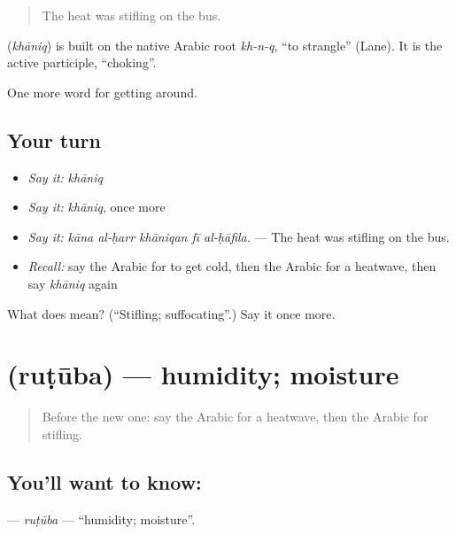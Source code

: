 \begin{quote}
The heat was stifling on the bus.
\end{quote}

\begin{cousinweb}
\textbf{} (\emph{khāniq}) is built on the native Arabic root \emph{kh-n-q}, \textquotedblleft{}to strangle\textquotedblright{} (Lane). It is the active participle, \textquotedblleft{}choking\textquotedblright{}.
\end{cousinweb}

\begin{grammarlens}[title={What you've built}]
One more word for getting around.
\end{grammarlens}

\subsection*{Your turn}
\begin{itemize}
\raggedright
  \item \emph{Say it:} \emph{khāniq}
  \item \emph{Say it:} \emph{khāniq}, once more
  \item \emph{Say it:} \emph{kāna al-ḥarr khāniqan fī al-ḥāfila.} — The heat was stifling on the bus.
  \item \emph{Recall:} say the Arabic for to get cold, then the Arabic for a heatwave, then say \emph{khāniq} again
\end{itemize}

\begin{tcolorbox}[breakable,colback=teal!4,colframe=teal!35!black,title={Before you move on}]
What does  mean? (\textquotedblleft{}Stifling; suffocating\textquotedblright{}.) Say it once more.
\end{tcolorbox}
\section[\texorpdfstring{\ar{رطوبة} (ruṭūba)}{رطوبة (ruṭūba)}]{ (ruṭūba) — humidity; moisture}

\label{lesson:AR-C484-rutuba}



\begin{quote}
Before the new one: say the Arabic for a heatwave, then the Arabic for stifling.
\end{quote}

\subsection*{You'll want to know: }
\textbf{} — \emph{ruṭūba} — \textquotedblleft{}humidity; moisture\textquotedblright{}.

